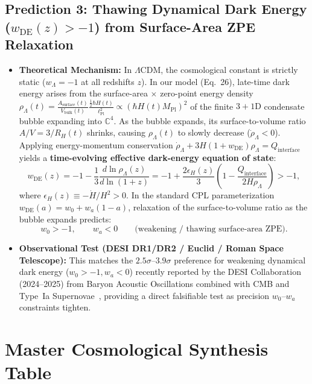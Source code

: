 \documentclass[11pt,a4paper]{article}
\begin{document}
\subsection{Prediction 3: Thawing Dynamical Dark Energy (\texorpdfstring{$w_{\text{DE}}(z) > -1$}{w\_DE(z) > -1}) from Surface-Area ZPE Relaxation}
\begin{itemize}
    \item \textbf{Theoretical Mechanism:} In $\Lambda\text{CDM}$, the cosmological constant is strictly static ($w_\Lambda = -1$ at all redshifts $z$). In our model (Eq.\ 26), late-time dark energy arises from the surface-area $\times$ zero-point energy density $\rho_\Lambda(t) = \frac{A_{\text{surface}}(t)}{V_{\text{bulk}}(t)}\frac{\frac{1}{2}\hbar H(t)}{\ell_{\text{Pl}}^2} \propto (\hbar H(t) M_{\text{Pl}})^2$ of the finite $3+1\text{D}$ condensate bubble expanding into $\mathbb{C}^4$. As the bubble expands, its surface-to-volume ratio $A/V = 3/R_H(t)$ shrinks, causing $\rho_\Lambda(t)$ to slowly decrease ($\dot{\rho}_\Lambda < 0$). Applying energy-momentum conservation $\dot{\rho}_\Lambda + 3 H (1 + w_{\text{DE}})\rho_\Lambda = Q_{\text{interface}}$ yields a \textbf{time-evolving effective dark-energy equation of state}:
    \begin{equation}
    w_{\text{DE}}(z) = -1 - \frac{1}{3}\frac{d\ln \rho_\Lambda(z)}{d\ln(1+z)} = -1 + \frac{2\epsilon_H(z)}{3}\left(1 - \frac{Q_{\text{interface}}}{2 H \rho_\Lambda}\right) > -1,
    \end{equation}
    where $\epsilon_H(z) \equiv -\dot{H}/H^2 > 0$. In the standard CPL parameterization $w_{\text{DE}}(a) = w_0 + w_a(1 - a)$, relaxation of the surface-to-volume ratio as the bubble expands predicts:
    \begin{equation}
    w_0 > -1, \qquad w_a < 0 \qquad \big(\text{weakening / thawing surface-area ZPE}\big).
    \end{equation}
    \item \textbf{Observational Test (DESI DR1/DR2 / Euclid / Roman Space Telescope):} This matches the $2.5\sigma\text{--}3.9\sigma$ preference for weakening dynamical dark energy ($w_0 > -1, w_a < 0$) recently reported by the DESI Collaboration (2024--2025) from Baryon Acoustic Oscillations combined with CMB and Type~Ia Supernovae~\cite{DESI2024,DESI2025}, providing a direct falsifiable test as precision $w_0\text{--}w_a$ constraints tighten.
\end{itemize}

\section{Master Cosmological Synthesis Table}
\end{document}
